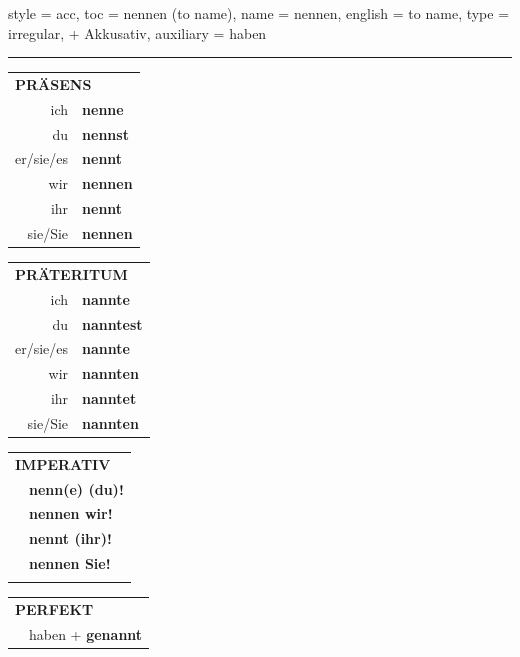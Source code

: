 \begin{verbentry}{
  style = {acc},
  toc = {nennen (to name)},
  name = {nennen},
  english = {to name},
  type = {irregular, + Akkusativ},
  auxiliary = {haben}
}
 
    
     \vspace{5pt}

    \hrule
    
    \vspace{5pt}

  \begin{tabular}{rl}
     \multicolumn{2}{l}{\textbf{PRÄSENS} }\\
    ich & \textbf{nenne}\\
    du & \textbf{nennst}\\
    er/sie/es & \textbf{nennt}\\
    wir & \textbf{nennen}\\
    ihr & \textbf{nennt}\\
    sie/Sie & \textbf{nennen}\\
  \end{tabular}
  \hfill
     \begin{tabular}{rl}
    \multicolumn{2}{l}{\textbf{PRÄTERITUM} }\\
    ich & \textbf{nannte}\\
    du & \textbf{nanntest}\\
    er/sie/es & \textbf{nannte}\\
    wir & \textbf{nannten}\\
    ihr & \textbf{nanntet}\\
    sie/Sie & \textbf{nannten}\\
  \end{tabular}
  \hfill
  \begin{tabular}{rl}
     \multicolumn{2}{l}{\textbf{IMPERATIV} }\\
   & \textbf{nenn(e) (du)!}\\
   & \textbf{nennen wir!}\\
   & \textbf{nennt (ihr)!}\\
   & \textbf{nennen Sie!}\\
   & \vspace{10pt}
  \end{tabular}

    \vspace{10pt}

 \begin{tabular}{rl}
     \multicolumn{2}{l}{\textbf{PERFEKT}}\\
  &  haben + \textbf{genannt}\\
  \end{tabular}
\hfill
   \begin{tabular}{rl}
   

\end{tabular}
\end{verbentry}

